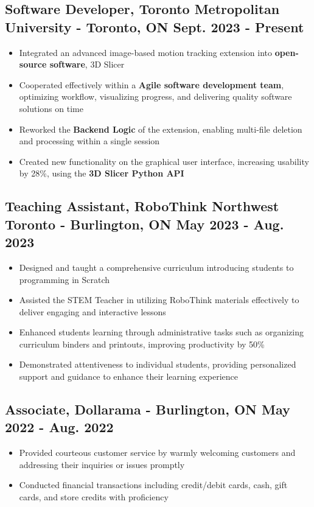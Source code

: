 \documentclass[10pt]{article}
\newcommand{\job}[3]{
    #1,  %
    \textmd{#2} %
    \hfill{\textmd{#3}} %
}
\begin{document}
\subsection{\job{Software Developer}{Toronto Metropolitan University - Toronto, ON}{Sept. 2023 - Present}}
\begin{itemize}
    \item Integrated an advanced image-based motion tracking extension into \textbf{open-source software}, 3D Slicer
    \item Cooperated effectively within a \textbf{Agile software development team}, optimizing workflow, visualizing progress, and delivering quality software solutions on time
    \item Reworked the \textbf{Backend Logic} of the extension, enabling multi-file deletion and processing within a single session
    \item Created new functionality on the graphical user interface, increasing usability by 28\%, using the \textbf{3D Slicer Python API}
\end{itemize}
\subsection{\job{Teaching Assistant}{RoboThink Northwest Toronto - Burlington, ON}{May 2023 - Aug. 2023}}
\begin{itemize}
    \item Designed and taught a comprehensive curriculum introducing students to programming in Scratch 
    \item Assisted the STEM Teacher in utilizing RoboThink materials effectively to deliver engaging and interactive lessons
    \item Enhanced students learning through administrative tasks such as organizing curriculum binders and printouts, improving productivity by 50\%
    \item Demonstrated attentiveness to individual students, providing personalized support and guidance to enhance their learning experience
\end{itemize}
\subsection{\job{Associate}{Dollarama - Burlington, ON}{May 2022 - Aug. 2022}}
\begin{itemize} 
    \item Provided courteous customer service by warmly welcoming customers and addressing their inquiries or issues promptly
    \item Conducted financial transactions including credit/debit cards, cash, gift cards, and store credits with proficiency
\end{itemize}
\end{document}
